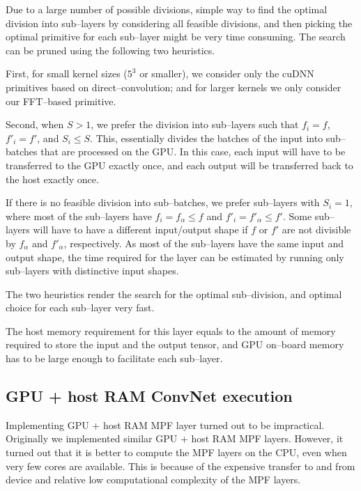 \documentclass[conference]{./IEEEtran/IEEEtran}
\begin{document}
  Due to a large number of possible divisions, simple way to find the
  optimal division into sub--layers by considering all feasible
  divisions, and then picking the optimal primitive for each
  sub--layer might be very time consuming.  The search can be pruned
  using the following two heuristics.

  First, for small kernel sizes ($5^3$ or smaller), we consider only
  the cuDNN primitives based on direct--convolution; and for larger
  kernels we only consider our FFT--based primitive.

  Second, when $S > 1$, we prefer the division into sub--layers such
  that $f_i=f$, $f'_i=f'$, and $S_i \le S$.  This, essentially divides
  the batches of the input into sub--batches that are processed on the
  GPU.  In this case, each input will have to be transferred to the
  GPU exactly once, and each output will be transferred back to the
  host exactly once.

  If there is no feasible division into sub--batches, we prefer
  sub--layers with $S_i = 1$, where most of the sub--layers have $f_i
  = f_{\alpha} \le f$ and $f'_i = f'_{\alpha} \le f'$.  Some
  sub--layers will have to have a different input/output shape if $f$
  or $f'$ are not divisible by $f_{\alpha}$ and $f'_{\alpha}$,
  respectively.  As most of the sub--layers have the same input and
  output shape, the time required for the layer can be estimated by
  running only sub--layers with distinctive input shapes.

  The two heuristics render the search for the optimal sub--division,
  and optimal choice for each sub--layer very fast.

  The host memory requirement for this layer equals to the amount of
  memory required to store the input and the output tensor, and GPU
  on--board memory has to be large enough to facilitate each
  sub--layer.

\subsection{GPU + host RAM ConvNet execution}

  Implementing GPU + host RAM MPF layer turned out to be impractical.
  Originally we implemented similar GPU + host RAM MPF layers.
  However, it turned out that it is better to compute the MPF layers
  on the CPU, even when very few cores are available.  This is because
  of the expensive transfer to and from device and relative low
  computational complexity of the MPF layers.
\end{document}
